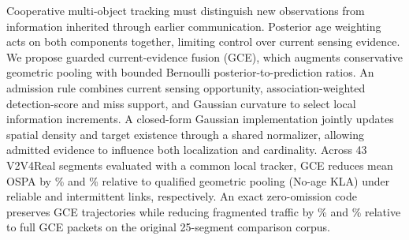 Cooperative multi-object tracking must distinguish new observations from
information inherited through earlier communication. Posterior age
weighting acts on both components together, limiting control over current
sensing evidence. We propose guarded current-evidence fusion (GCE), which
augments conservative geometric pooling with bounded Bernoulli
posterior-to-prediction ratios. An admission rule combines current sensing
opportunity, association-weighted detection-score and miss support, and
Gaussian curvature to select local information increments. A closed-form
Gaussian implementation jointly updates spatial density and target
existence through a shared normalizer, allowing admitted evidence to
influence both localization and cardinality. Across 43 V2V4Real segments
evaluated with a common local tracker, GCE reduces mean OSPA by
\FollowGainNoAgeReliable\% and \FollowGainNoAgeIntermittent\% relative to
qualified geometric pooling (No-age KLA) under reliable and intermittent links,
respectively. An exact zero-omission code preserves GCE trajectories while
reducing fragmented traffic by \CodecWireSavingReliable\% and
\CodecWireSavingIntermittent\% relative to full GCE packets on the original
25-segment comparison corpus.
